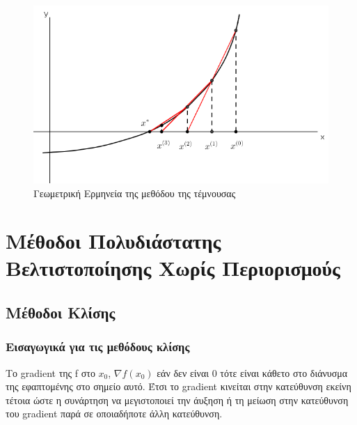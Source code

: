\documentclass[a4paper,12pt,twoside]{report}
\theoremstyle{plain}
\theoremstyle{definition}
\theoremstyle{remark}
\begin{document}
\begin{figure}[H]
\includegraphics[scale=0.5]{secant}
\centering
    \caption{Γεωμετρική Ερμηνεία της μεθόδου της τέμνουσας}
\end{figure}


\newpage
\chapter{Μέθοδοι Πολυδιάστατης Βελτιστοποίησης Χωρίς Περιορισμούς}

\section{Μέθοδοι Κλίσης}
\subsection{Εισαγωγικά για τις μεθόδους κλίσης}
    Το gradient της f στο $x_{0}$, $\nabla f(x_{0})$ εάν δεν είναι 0 τότε είναι κάθετο στο διάνυσμα της εφαπτομένης στο σημείο αυτό. Έτσι το gradient κινείται στην κατεύθυνση εκείνη τέτοια ώστε η συνάρτηση να μεγιστοποιεί την άυξηση ή τη μείωση στην κατεύθυνση του gradient παρά σε οποιαδήποτε άλλη κατεύθυνση. 
    
\end{document}
